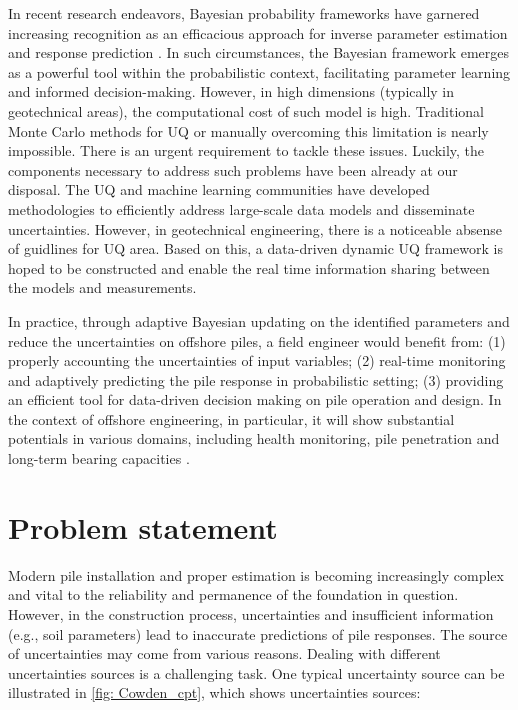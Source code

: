 In recent research endeavors, Bayesian probability frameworks have garnered increasing recognition as an efficacious approach for inverse parameter estimation and response prediction \citep{finno2005,nakamura2011,hsein2013,nguyen2016,wagner2020,jin2021,tao2021,buckley2023,tang2023}. In such circumstances, the Bayesian framework emerges as a powerful tool within the probabilistic context, facilitating parameter learning and informed decision-making. However, in high dimensions (typically in geotechnical areas), the computational cost of such model is high. Traditional Monte Carlo methods for UQ or manually overcoming this limitation is nearly impossible. There is an urgent requirement to tackle these issues. Luckily, the components necessary to address such problems have been already at our disposal. The UQ and machine learning communities have developed methodologies to efficiently address large-scale data models and disseminate uncertainties. However, in geotechnical engineering, there is a noticeable absense of guidlines for UQ area. Based on this, a data-driven dynamic UQ framework is hoped to be constructed and enable the real time information sharing between the models and measurements. 

In practice, through adaptive Bayesian updating on the identified parameters and reduce the uncertainties on offshore piles, a field engineer would benefit from: (1) properly accounting the uncertainties of input variables; (2) real-time monitoring and adaptively predicting the pile response in probabilistic setting; (3) providing an efficient tool for data-driven decision making on pile operation and design. In the context of offshore engineering, in particular, it will show substantial potentials in various domains, including health monitoring, pile penetration and long-term bearing capacities \citep{wang2021,zhao2023,stuyts2023}. 



\section{Problem statement}

Modern pile installation and proper estimation is becoming increasingly complex and vital to the reliability and permanence of the foundation in question. However, in the construction process, uncertainties and insufficient information (e.g., soil parameters) lead to inaccurate predictions of pile responses. The source of uncertainties may come from various reasons. Dealing with different uncertainties sources is a challenging task. One typical uncertainty source can be illustrated in \cref{fig: Cowden_cpt}, which shows uncertainties sources:

